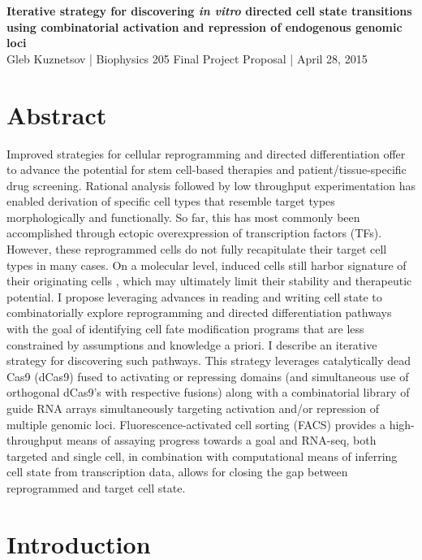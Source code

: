 \documentclass[10pt]{article}
\begin{document}
\thispagestyle{empty}

\begin{flushleft}
    {\Large
        \textbf{Iterative strategy for discovering \textit{in vitro} directed cell state transitions using combinatorial activation and repression of endogenous genomic loci}
    }
    \\
    Gleb Kuznetsov | Biophysics 205 Final Project Proposal | April 28, 2015
\end{flushleft}

\section*{Abstract}

Improved strategies for cellular reprogramming and directed differentiation offer to advance the potential for stem cell-based therapies and patient/tissue-specific drug screening. Rational analysis followed by low throughput experimentation has enabled derivation of specific cell types that resemble target types morphologically and functionally. So far, this has most commonly been accomplished through ectopic overexpression of transcription factors (TFs). However, these reprogrammed cells do not fully recapitulate their target cell types in many cases. On a molecular level, induced cells still harbor signature of their originating cells \cite{cahan2014cellnet}, which may ultimately limit their stability and therapeutic potential. I propose leveraging advances in reading and writing cell state to combinatorially explore reprogramming and directed differentiation pathways with the goal of identifying cell fate modification programs that are less constrained by assumptions and knowledge a priori. I describe an iterative strategy for discovering such pathways. This strategy leverages catalytically dead Cas9 (dCas9) fused to activating or repressing domains (and simultaneous use of orthogonal dCas9's with respective fusions) along with a combinatorial library of guide RNA arrays simultaneously targeting activation and/or repression of multiple genomic loci. Fluorescence-activated cell sorting (FACS) provides a high-throughput means of assaying progress towards a goal and RNA-seq, both targeted and single cell, in combination with computational means of inferring cell state from transcription data, allows for closing the gap between reprogrammed and target cell state.

\section*{Introduction}
\end{document}
